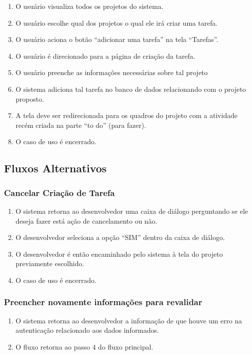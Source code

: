 \begin{enumerate}
  \item O usuário visualiza todos os projetos do sistema.
  \item O usuário escolhe qual dos projetos o qual ele irá criar uma tarefa.
  \item O usuário aciona o botão “adicionar uma tarefa” na tela “Tarefas”.
  \item O usuário é direcionado para a página de criação da tarefa.
  \item O usuário preenche as informações necessárias sobre tal projeto
  \item O sistema adiciona tal tarefa no banco de dados relacionando com o projeto proposto.
  \item A tela deve ser redirecionada para os quadros do projeto com a atividade recém criada na parte “to do” (para fazer).
  \item O caso de uso é encerrado.
\end{enumerate}

\subsection{Fluxos Alternativos}

\subsubsection{Cancelar Criação de Tarefa}

\begin{enumerate}
  \item O sistema retorna ao desenvolvedor uma caixa de diálogo perguntando se ele deseja fazer está ação de cancelamento ou não.
  \item O desenvolvedor seleciona a opção “SIM” dentro da caixa de diálogo.
  \item O desenvolvedor é então encaminhado pelo sistema à tela do projeto previamente escolhido.
  \item O caso de uso é encerrado.
\end{enumerate}

\subsubsection{Preencher novamente informações para revalidar}

\begin{enumerate}
  \item O sistema retorna ao desenvolvedor a informação de que houve um erro na autenticação relacionado aos dados informados.
  \item O fluxo retorna ao passo 4 do fluxo principal.
\end{enumerate}

